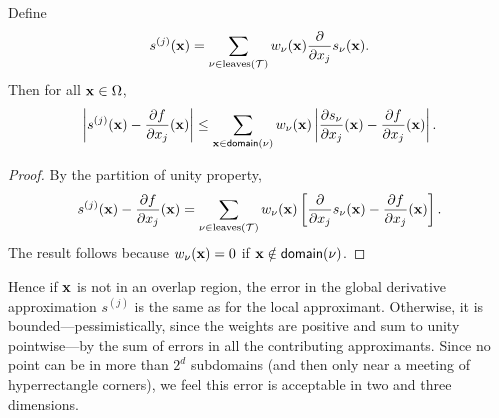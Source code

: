 \begin{thm}
  Define
  \begin{equation}
    \label{eq:pu-deriv}
    s^{(j)}(\mathbf{x})=\sum_{\nu\in \text{leaves}(\mathcal{T})} w_\nu(\mathbf{x}) \frac{\partial }{\partial x_j} s_\nu(\mathbf{x}).
  \end{equation}
  Then for all $\mathbf{x}\in\Omega$,
  \begin{equation}
    \label{eq:pu-deriv-error}
    \left|s^{(j)}(\vect{x})-\pp{f}{x_j}(\vect{x})\right| \le \sum_{\vect{x} \in \prop{domain}{\nu}} w_\nu(\vect{x}) \left| \pp{s_\nu}{x_j}(\vect{x}) - \pp{f}{x_j} (\vect{x})\right|. %
  \end{equation}
\end{thm}
\begin{proof}
  By the partition of unity property,
  \[
    s^{(j)}(\mathbf{x})-\frac{\partial f}{\partial x_j}(\mathbf{x}) = \sum_{\nu\in \text{leaves}(\mathcal{T})} w_\nu(\mathbf{x}) \left[\frac{\partial }{\partial x_j} s_\nu(\mathbf{x}) - \frac{\partial f}{\partial x_j}(\mathbf{x})\right].
  \]
  The result follows because $w_\nu(\mathbf{x})=0$ if $\mathbf{x}\notin \textsf{domain}(\nu)$.%
\end{proof}

Hence if $\mathbf{x}$ is not in an overlap region, the error in the global derivative approximation $s^{(j)}$ is the same as for the local approximant. Otherwise, it is bounded---pessimistically, since the weights are positive and sum to unity pointwise---by the sum of errors in all the contributing approximants. Since no point can be in more than $2^d$ subdomains (and then only near a meeting of hyperrectangle corners), we feel this error is acceptable in two and three dimensions.  




